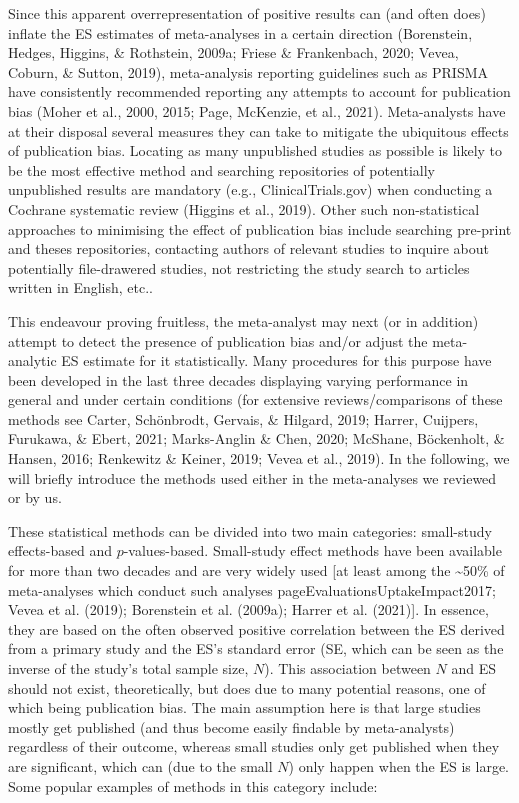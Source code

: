 \documentclass[
  man,floatsintext]{apa6}
\begin{document}
Since this apparent overrepresentation of positive results can (and often does) inflate the ES estimates of meta-analyses in a certain direction (Borenstein, Hedges, Higgins, \& Rothstein, 2009a; Friese \& Frankenbach, 2020; Vevea, Coburn, \& Sutton, 2019), meta-analysis reporting guidelines such as PRISMA have consistently recommended reporting any attempts to account for publication bias (Moher et al., 2000, 2015; Page, McKenzie, et al., 2021). Meta-analysts have at their disposal several measures they can take to mitigate the ubiquitous effects of publication bias. Locating as many unpublished studies as possible is likely to be the most effective method and searching repositories of potentially unpublished results are mandatory (e.g., ClinicalTrials.gov) when conducting a Cochrane systematic review (Higgins et al., 2019). Other such non-statistical approaches to minimising the effect of publication bias include searching pre-print and theses repositories, contacting authors of relevant studies to inquire about potentially file-drawered studies, not restricting the study search to articles written in English, etc..

This endeavour proving fruitless, the meta-analyst may next (or in addition) attempt to detect the presence of publication bias and/or adjust the meta-analytic ES estimate for it statistically. Many procedures for this purpose have been developed in the last three decades displaying varying performance in general and under certain conditions (for extensive reviews/comparisons of these methods see Carter, Schönbrodt, Gervais, \& Hilgard, 2019; Harrer, Cuijpers, Furukawa, \& Ebert, 2021; Marks-Anglin \& Chen, 2020; McShane, Böckenholt, \& Hansen, 2016; Renkewitz \& Keiner, 2019; Vevea et al., 2019). In the following, we will briefly introduce the methods used either in the meta-analyses we reviewed or by us.

These statistical methods can be divided into two main categories: small-study effects-based and \(p\)-values-based. Small-study effect methods have been available for more than two decades and are very widely used {[}at least among the \textasciitilde50\% of meta-analyses which conduct such analyses pageEvaluationsUptakeImpact2017; Vevea et al. (2019); Borenstein et al. (2009a); Harrer et al. (2021){]}. In essence, they are based on the often observed positive correlation between the ES derived from a primary study and the ES's standard error (SE, which can be seen as the inverse of the study's total sample size, \(N\)). This association between \(N\) and ES should not exist, theoretically, but does due to many potential reasons, one of which being publication bias. The main assumption here is that large studies mostly get published (and thus become easily findable by meta-analysts) regardless of their outcome, whereas small studies only get published when they are significant, which can (due to the small \(N\)) only happen when the ES is large. Some popular examples of methods in this category include:
\end{document}
